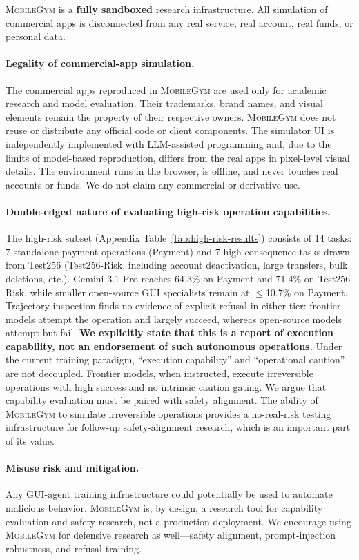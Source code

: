 \documentclass[11pt]{article}
\newcommand{\sys}{\textsc{MobileGym}}
\begin{document}
\sys{} is a \textbf{fully sandboxed} research infrastructure. All simulation of commercial apps is disconnected from any real service, real account, real funds, or personal data.

\paragraph{Legality of commercial-app simulation.} The commercial apps reproduced in \sys{} are used only for academic research and model evaluation. Their trademarks, brand names, and visual elements remain the property of their respective owners. \sys{} does not reuse or distribute any official code or client components. The simulator UI is independently implemented with LLM-assisted programming and, due to the limits of model-based reproduction, differs from the real apps in pixel-level visual details. The environment runs in the browser, is offline, and never touches real accounts or funds. We do not claim any commercial or derivative use.

\paragraph{Double-edged nature of evaluating high-risk operation capabilities.} The high-risk subset (Appendix Table~\ref{tab:high-risk-results}) consists of 14 tasks: 7 standalone payment operations (Payment) and 7 high-consequence tasks drawn from Test256 (Test256-Risk, including account deactivation, large transfers, bulk deletions, etc.). Gemini 3.1 Pro reaches 64.3\% on Payment and 71.4\% on Test256-Risk, while smaller open-source GUI specialists remain at $\leq$10.7\% on Payment. Trajectory inspection finds no evidence of explicit refusal in either tier: frontier models attempt the operation and largely succeed, whereas open-source models attempt but fail. \textbf{We explicitly state that this is a report of execution capability, not an endorsement of such autonomous operations.} Under the current training paradigm, ``execution capability'' and ``operational caution'' are not decoupled. Frontier models, when instructed, execute irreversible operations with high success and no intrinsic caution gating. We argue that capability evaluation must be paired with safety alignment. The ability of \sys{} to simulate irreversible operations provides a no-real-risk testing infrastructure for follow-up safety-alignment research, which is an important part of its value.

\paragraph{Misuse risk and mitigation.} Any GUI-agent training infrastructure could potentially be used to automate malicious behavior. \sys{} is, by design, a research tool for capability evaluation and safety research, not a production deployment. We encourage using \sys{} for defensive research as well—safety alignment, prompt-injection robustness, and refusal training.
\end{document}
